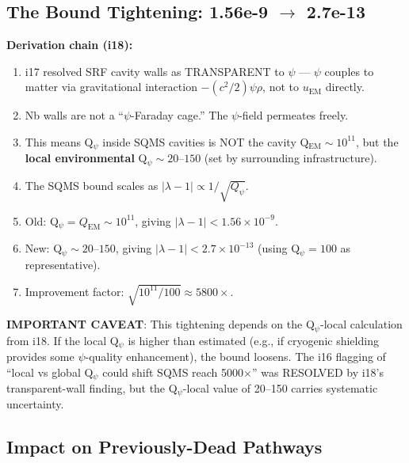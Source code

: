 \documentclass[11pt]{article}
\begin{document}
\subsection{The Bound Tightening: 1.56e-9 $\to$ 2.7e-13}

\textbf{Derivation chain (i18):}
\begin{enumerate}
\item i17 resolved SRF cavity walls as TRANSPARENT to $\psi$ --- $\psi$ couples to matter via gravitational interaction $-(c^2/2)\psi\rho$, not to $u_\text{EM}$ directly.
\item Nb walls are not a ``$\psi$-Faraday cage.'' The $\psi$-field permeates freely.
\item This means Q$_\psi$ inside SQMS cavities is NOT the cavity Q$_\text{EM} \sim 10^{11}$, but the \textbf{local environmental} Q$_\psi \sim 20$--$150$ (set by surrounding infrastructure).
\item The SQMS bound scales as $|\lambda-1| \propto 1/\sqrt{Q_\psi}$.
\item Old: Q$_\psi = Q_\text{EM} \sim 10^{11}$, giving $|\lambda-1| < 1.56 \times 10^{-9}$.
\item New: Q$_\psi \sim 20$--$150$, giving $|\lambda-1| < 2.7 \times 10^{-13}$ (using Q$_\psi = 100$ as representative).
\item Improvement factor: $\sqrt{10^{11}/100} \approx 5800\times$.
\end{enumerate}

\textbf{IMPORTANT CAVEAT}: This tightening depends on the Q$_\psi$-local calculation from i18. If the local Q$_\psi$ is higher than estimated (e.g., if cryogenic shielding provides some $\psi$-quality enhancement), the bound loosens. The i16 flagging of ``local vs global Q$_\psi$ could shift SQMS reach 5000$\times$'' was RESOLVED by i18's transparent-wall finding, but the Q$_\psi$-local value of 20--150 carries systematic uncertainty.

\subsection{Impact on Previously-Dead Pathways}
\end{document}
